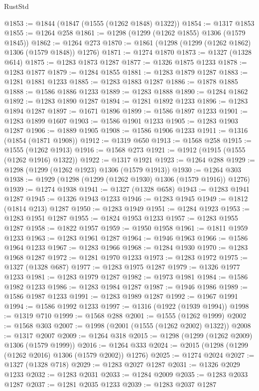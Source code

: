 \begin{lexlean}{RustStd}
\begin{coremodule}
@1853 := @1844 (@1847 (@1555 (@1262 @1848) @1322))
@1854 := @1317 @1853
@1855 := @1264 @258
@1861 := @1298 (@1299 (@1262 @1855) @1306 (@1579 @1845))
@1862 := @1264 @273
@1870 := @1861 (@1298 (@1299 (@1262 @1862) @1306 (@1579 @1848)) @1276)
@1871 := @1274 @1870
@1873 := @1327 (@1328 @614)
@1875 := @1283 @1873 @1287
@1877 := @1326 @1875 @1233
@1878 := @1283 @1877
@1879 := @1284 @1855
@1881 := @1283 @1879 @1287
@1883 := @1281 @1881 @1233
@1885 := @1283 @1883 @1287
@1886 := @1878 @1885
@1888 := @1586 @1886 @1233
@1889 := @1283 @1888
@1890 := @1284 @1862
@1892 := @1283 @1890 @1287
@1894 := @1281 @1892 @1233
@1896 := @1283 @1894 @1287
@1897 := @1671 @1896
@1899 := @1586 @1897 @1233
@1901 := @1283 @1899 @1607
@1903 := @1586 @1901 @1233
@1905 := @1283 @1903 @1287
@1906 := @1889 @1905
@1908 := @1586 @1906 @1233
@1911 := @1316 (@1854 (@1871 @1908))
@1912 := @1319 @650
@1913 := @1568 @258
@1915 := @1555 (@1262 @1913)
@1916 := @1568 @273
@1921 := @1912 (@1915 (@1555 (@1262 @1916) @1322))
@1922 := @1317 @1921
@1923 := @1264 @288
@1929 := @1298 (@1299 (@1262 @1923) @1306 (@1579 @1913))
@1930 := @1264 @303
@1938 := @1929 (@1298 (@1299 (@1262 @1930) @1306 (@1579 @1916)) @1276)
@1939 := @1274 @1938
@1941 := @1327 (@1328 @658)
@1943 := @1283 @1941 @1287
@1945 := @1326 @1943 @1233
@1946 := @1283 @1945
@1949 := @1812 (@1814 @213) @1287
@1950 := @1283 @1949
@1951 := @1284 @1923
@1953 := @1283 @1951 @1287
@1955 := @1824 @1953 @1233
@1957 := @1283 @1955 @1287
@1958 := @1822 @1957
@1959 := @1950 @1958
@1961 := @1811 @1959 @1233
@1963 := @1283 @1961 @1287
@1964 := @1946 @1963
@1966 := @1586 @1964 @1233
@1967 := @1283 @1966
@1968 := @1284 @1930
@1970 := @1283 @1968 @1287
@1972 := @1281 @1970 @1233
@1973 := @1283 @1972
@1975 := @1327 (@1328 @687)
@1977 := @1283 @1975 @1287
@1979 := @1326 @1977 @1233
@1981 := @1283 @1979 @1287
@1982 := @1973 @1981
@1984 := @1586 @1982 @1233
@1986 := @1283 @1984 @1287
@1987 := @1946 @1986
@1989 := @1586 @1987 @1233
@1991 := @1283 @1989 @1287
@1992 := @1967 @1991
@1994 := @1586 @1992 @1233
@1997 := @1316 (@1922 (@1939 @1994))
@1998 := @1319 @710
@1999 := @1568 @288
@2001 := @1555 (@1262 @1999)
@2002 := @1568 @303
@2007 := @1998 (@2001 (@1555 (@1262 @2002) @1322))
@2008 := @1317 @2007
@2009 := @1264 @318
@2015 := @1298 (@1299 (@1262 @2009) @1306 (@1579 @1999))
@2016 := @1264 @333
@2024 := @2015 (@1298 (@1299 (@1262 @2016) @1306 (@1579 @2002)) @1276)
@2025 := @1274 @2024
@2027 := @1327 (@1328 @718)
@2029 := @1283 @2027 @1287
@2031 := @1326 @2029 @1233
@2032 := @1283 @2031
@2033 := @1284 @2009
@2035 := @1283 @2033 @1287
@2037 := @1281 @2035 @1233
@2039 := @1283 @2037 @1287

\end{coremodule}
\end{lexlean}
